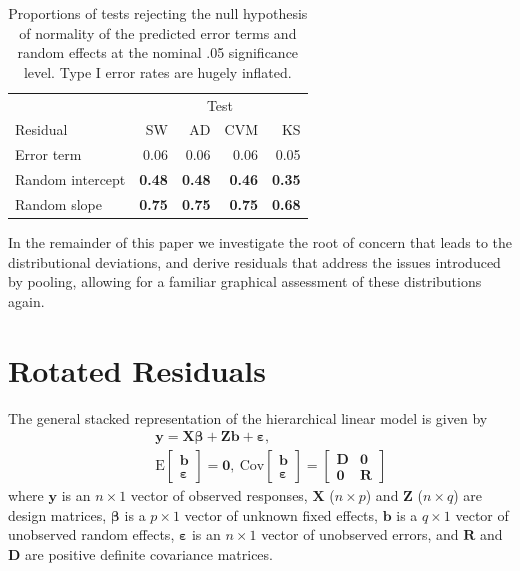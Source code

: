 \documentclass[11pt]{article} %
\newcommand{\E}{\ensuremath{\mathrm{E}}}
\newcommand{\cov}{\ensuremath{\mathrm{Cov}}}
\begin{document}
%
\begin{table}[htb]
\caption{\label{tab:edf} Proportions of tests rejecting the null hypothesis of normality of the predicted error terms and random effects at the nominal .05 significance level. Type I error rates are hugely inflated. \vspace{.5em}
}
\begin{center}
\begin{tabular}{l rrrr} \hline
& \multicolumn{4}{c}{Test} \\ \cline{2-5}
 Residual & SW &  AD & CVM & KS \\ \hline
Error term			& 0.06 & 0.06 & 0.06 & 0.05\\
Random intercept 	& \bf 0.48 & \bf 0.48 & \bf 0.46 & \bf 0.35\\
Random slope 		& \bf 0.75 & \bf 0.75 & \bf 0.75 & \bf 0.68\\
   \hline
\end{tabular}
\end{center}
\end{table}

In the remainder of this paper we investigate the root of concern that leads to the distributional deviations, and derive residuals that address the issues introduced by pooling, allowing for a familiar graphical assessment of these distributions again.

\section{Rotated Residuals}\label{sec:resid}
The general stacked representation of the hierarchical linear model is given by
%
\begin{eqnarray}\label{eq:hlm}
 && \bm{y} = \bm{X \beta} + \bm{Z b} + \bm{\varepsilon}, \\ \nonumber
 && \E \begin{bmatrix} \bm{b} \\ \bm{\varepsilon} \end{bmatrix} = \bm{0}, 
 \ \cov \begin{bmatrix} \bm{b} \\ \bm{\varepsilon} \end{bmatrix} = 
  	\begin{bmatrix} \bm{D} & \bm{0}\\ \bm{0} & \bm{R} \end{bmatrix}
\end{eqnarray}
%
where $\bm{y}$ is an $n \times 1$ vector of observed responses, $\bm{X}$ ($n \times p$) and $\bm{Z}$ ($n \times q$) are design matrices, $\bm{\beta}$ is a $p \times 1$ vector of unknown fixed effects, $\bm{b}$ is a $q \times 1$ vector of unobserved random effects, $\bm{\varepsilon}$ is an $n \times 1$ vector of unobserved errors, and $\bm{R}$ and $\bm{D}$ are positive definite covariance matrices.
\end{document}
